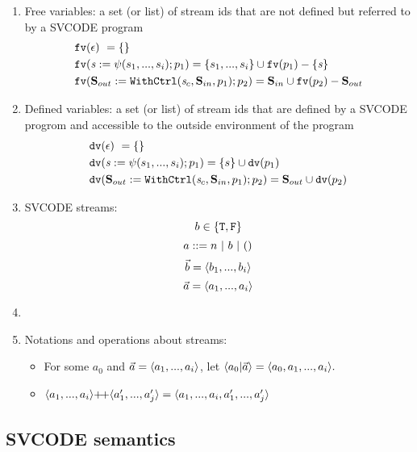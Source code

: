 \begin{enumerate}[(1)]
\item Free variables: a set (or list) of stream ids that are not defined but referred to by a SVCODE program
\begin{align*}
	&\mathtt{fv}(\epsilon) \ = \{\}\\
	&\mathtt{fv}(\mathit{s} := \psi(s_1,...,s_i);p_1) = \{s_1,...,s_i\} \cup \mathtt{fv}(p_1) - \{\mathit{s}\}\\
	&\mathtt{fv}(\mathbf{S}_{out} := \mathtt{WithCtrl}(\mathit{s}_c,\mathbf{S}_{in},p_1);p_2)  = \mathbf{S}_{in} \cup \mathtt{fv}(p_2) - \mathbf{S}_{out}
\end{align*}




\item Defined variables: a set (or list) of stream ids that are defined by a SVCODE progrom and accessible to the outside environment of the program
\begin{align*}
	&\mathtt{dv}(\epsilon) \ = \{\}\\
	&\mathtt{dv}(\mathit{s} := \psi(s_1,...,s_i);p_1) = \{s\} \cup \mathtt{dv}(p_1)\\
	&\mathtt{dv}(\mathbf{S}_{out} := \mathtt{WithCtrl}(\mathit{s}_c,\mathbf{S}_{in},p_1);p_2)  = \mathbf{S}_{out} \cup \mathtt{dv}(p_2)
\end{align*}


\item SVCODE streams: 
$$b \in \{\mathtt{T},\mathtt{F} \}$$
$$ a ::= n \ | \ b \ | \ \unit$$
$$\vec b = \langle b_1,...,b_i \rangle$$ 
$$\vec a = \langle a_1,...,a_i \rangle  $$

\item



\item Notations and operations about streams:
\begin{itemize}
	\item For some $a_0$ and $\a = \< a_1,...,a_i \'>$, let $\< a_0 | \a \'>  = \< a_0,a_1,...,a_i \'>. $ 

	\item $\vapp{\vrange{a_1}{a_i}} {\vrange{a_1'}{a_j'}} = \langle a_1,...,a_i,a_1',...,a_j' \rangle $ \\


\end{itemize}

\end{enumerate}

\subsection{SVCODE semantics}

